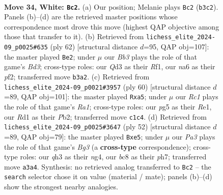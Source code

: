 \documentclass[11pt]{article}
\begin{document}
\clearpage

\begin{figure}[p]\centering
\begin{subfigure}{0.46\textwidth}\centering
\resizebox{\linewidth}{!}{%
\newchessgame
\chessboard[
  setfen={1rb5/pp4k1/n5p1/2pP2p1/7p/PB1Q1PPq/1P5P/2RR2K1 w - - 0 34},
  showmover=false,
  pgfstyle=straightmove, color=movearrow, markmove={b3-c2}
]}
\caption{}
\end{subfigure}\hfill
\begin{subfigure}{0.46\textwidth}\centering
\resizebox{\linewidth}{!}{%
\newchessgame
\chessboard[
  setfen={r4rk1/p7/4P2p/2pP3q/2Pb2p1/3B3P/P2Q1pP1/2R2R1K w - - 0 32},
  showmover=false,
  pgfstyle=straightmove, color=movearrow, markmove={d3-e2}
]}
\caption{}
\end{subfigure}
\\[4pt]
\begin{subfigure}{0.46\textwidth}\centering
\resizebox{\linewidth}{!}{%
\newchessgame
\chessboard[
  setfen={3k3r/2p1n1p1/3p2q1/pb1P1p2/4P2p/2B5/1P1K1QPP/R3R3 w - - 0 31},
  showmover=false,
  pgfstyle=straightmove, color=movearrow, markmove={a1-a5}
]}
\caption{}
\end{subfigure}\hfill
\begin{subfigure}{0.46\textwidth}\centering
\resizebox{\linewidth}{!}{%
\newchessgame
\chessboard[
  setfen={q2br1k1/6pp/p2P4/1pp1pP2/P5n1/1P4B1/1Q4PP/4RRK1 w - - 0 27},
  showmover=false,
  pgfstyle=straightmove, color=movearrow, markmove={g3-e5}
]}
\caption{}
\end{subfigure}
\caption{\textbf{Move 34, White: \texttt{Bc2}.} (a) Our position; Melanie plays \texttt{Bc2} (\texttt{b3c2}). Panels (b)--(d) are the retrieved master positions whose correspondence most drove this move (highest QAP objective among those that transfer to it). (b) Retrieved from \texttt{lichess\_elite\_2024-09\_p0025\#635} (ply 62) [structural distance $d$=95, QAP obj=107]: the master played \texttt{Be2}; under $\mu$ our \emph{Bb3} plays the role of that game's \emph{Bd3}; cross-type roles: our \emph{Q}d3 as their \emph{R}f1, our \emph{n}a6 as their \emph{p}f2; transferred move \texttt{b3a2}. (c) Retrieved from \texttt{lichess\_elite\_2024-09\_p0021\#3957} (ply 60) [structural distance $d$=89, QAP obj=101]: the master played \texttt{Rxa5}; under $\mu$ our \emph{Rc1} plays the role of that game's \emph{Ra1}; cross-type roles: our \emph{p}g5 as their \emph{R}e1, our \emph{R}d1 as their \emph{P}b2; transferred move \texttt{c1c4}. (d) Retrieved from \texttt{lichess\_elite\_2024-09\_p0025\#3647} (ply 52) [structural distance $d$=89, QAP obj=79]: the master played \texttt{Bxe5}; under $\mu$ our \emph{Pa3} plays the role of that game's \emph{Bg3} (a \textbf{cross-type} correspondence); cross-type roles: our \emph{q}h3 as their \emph{n}g4, our \emph{b}c8 as their \emph{p}h7; transferred move \texttt{a3a4}. Synthesis: no retrieved analog transferred to \texttt{Bc2} -- the \texttt{search} selector chose it on value (material / mate); panels (b)--(d) show the strongest nearby analogies.}
\label{fig:thought-m66}
\end{figure}
\end{document}
